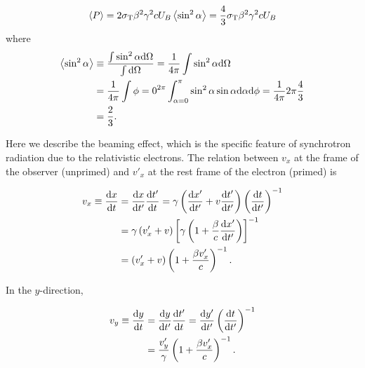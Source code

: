 \begin{equation}\label{eq:essential_radio5n38}
    \left\langle P\right\rangle = 2 \sigma_{\mathrm{T}} \beta^2 \gamma^2 c U_B\left\langle\sin^2 \alpha\right\rangle = \frac{4}{3}\sigma_{\mathrm{T}} \beta^2 \gamma^2 c U_B
\end{equation}
where
\begin{equation}\label{eq:essential_radio5n39}
    \begin{aligned}
    \left\langle\sin^2 \alpha\right\rangle & \equiv \frac{\int \sin^2 \alpha \mathrm{d} \Omega}{\int \mathrm{d} \Omega}=\frac{1}{4\pi} \int \sin^2 \alpha \mathrm{d} \Omega \\
                        &=\frac{1}{4\pi} \int {\phi=0}^{2\pi} \int_{\alpha=0}^{\pi} \sin^2 \alpha \sin \alpha \mathrm{d} \alpha \mathrm{d} \phi=\frac{1}{4\pi} 2 \pi \frac{4}{3} \\
                        &=\frac{2}{3}.
    \end{aligned}
\end{equation}

Here we describe the beaming effect, which is the specific feature of synchrotron radiation due to the relativistic electrons.
The relation between $v_x$ at the frame of the observer (unprimed) and $v'_x$  at the rest frame of the electron (primed) is

\begin{equation}\label{eq:essential_radio5n43}
    \begin{aligned}
        v_x \equiv \frac{\mathrm{d} x}{\mathrm{d} t} &= \frac{\mathrm{d} x}{\mathrm{d} t^{\prime}} \frac{\mathrm{d} t^{\prime}}{\mathrm{d} t}=\gamma\left(\frac{\mathrm{d} x^{\prime}}{\mathrm{d} t^{\prime}}+v \frac{\mathrm{d} t^{\prime}}{\mathrm{d} t^{\prime}}\right)\left(\frac{\mathrm{d} t}{\mathrm{d} t^{\prime}}\right)^{-1} \\
                                       &=\gamma\left(v_x^{\prime}+v\right)\left[\gamma\left(1+\frac{\beta}{c} \frac{\mathrm{d} x^{\prime}}{\mathrm{d} t^{\prime}}\right)\right]^{-1} \\
                                       &=\left(v_x^{\prime}+v\right)\left(1+\frac{\beta v_x^{\prime}}{c}\right)^{-1}.
    \end{aligned}
\end{equation}

In the $y$-direction,

\begin{equation}\label{eq:essential_radio5n46}
    \begin{aligned}
        v_y \equiv \frac{\mathrm{d} y}{\mathrm{d} t} &= \frac{\mathrm{d} y}{\mathrm{d} t^{\prime}} \frac{\mathrm{d} t^{\prime}}{\mathrm{d} t}=\frac{\mathrm{d} y^{\prime}}{\mathrm{d} t^{\prime}}\left(\frac{\mathrm{d} t}{\mathrm{d} t^{\prime}}\right)^{-1} \\
                                       &= \frac{v_y^{\prime}}{\gamma}\left(1+\frac{\beta v_x^{\prime}}{c}\right)^{-1}.
    \end{aligned}
\end{equation}

